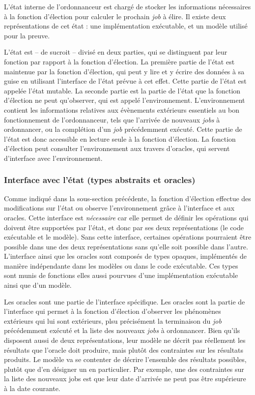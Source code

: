 			L'état interne de l'ordonnanceur est chargé de stocker les informations nécessaires à la fonction d'élection pour calculer le prochain \emph{job} à élire. Il existe deux représentations de cet état : une implémentation exécutable, et un modèle utilisé pour la preuve.

			L'état est -- de sucroit -- divisé en deux parties, qui se distinguent par leur fonction par rapport à la fonction d'élection. La première partie de l'état est maintenue par la fonction d'élection, qui peut y lire et y écrire des données à sa guise en utilisant l'interface de l'état prévue à cet effet. Cette partie de l'état est appelée l'état mutable. La seconde partie est la partie de l'état que la fonction d'élection ne peut qu'observer, qui est appelé l'environnement. L'environnement contient les informations relatives aux évènements extérieurs essentiels au bon fonctionnement de l'ordonnanceur, tels que l'arrivée de nouveaux \emph{jobs} à ordonnancer, ou la complétion d'un \emph{job} précédemment exécuté. Cette partie de l'état est donc accessible en lecture seule à la fonction d'élection. La fonction d'élection peut consulter l'environnement aux travers d'oracles, qui servent d'interface avec l'environnement.

		\subsubsection{Interface avec l'état (types abstraits et oracles)}
			
			Comme indiqué dans la sous-section précédente, la fonction d'élection effectue des modifications sur l'état ou observe l'environnement grâce à l'interface et aux oracles. Cette interface est \emph{nécessaire} car elle permet de définir les opérations qui doivent être supportées par l'état, et donc par ses deux représentations (le code exécutable et le modèle). Sans cette interface, certaines opérations pourraient être possible dans une des deux représentations sans qu'elle soit possible dans l'autre.
			L'interface ainsi que les oracles sont composés de types opaques, implémentés de manière indépendante dans les modèles ou dans le code exécutable. Ces types sont munis de fonctions elles aussi pourvues d'une implémentation exécutable ainsi que d'un modèle.

			Les oracles sont une partie de l'interface spécifique. Les oracles sont la partie de l'interface qui permet à la fonction d'élection d'observer les phénomènes extérieurs qui lui sont extérieurs, plsu précisément la terminaison du \emph{job} précédemment exécuté et la liste des nouveaux \emph{jobs} à ordonnancer. Bien qu'ils disposent aussi de deux représentations, leur modèle ne décrit pas réellement les résultats que l'oracle doit produire, mais plutôt des contraintes sur les résultats produits. Le modèle va se contenter de décrire l'ensemble des résultats possibles, plutôt que d'en désigner un en particulier. Par exemple, une des contraintes sur la liste des nouveaux jobs est que leur date d'arrivée ne peut pas être supérieure à la date courante. 

